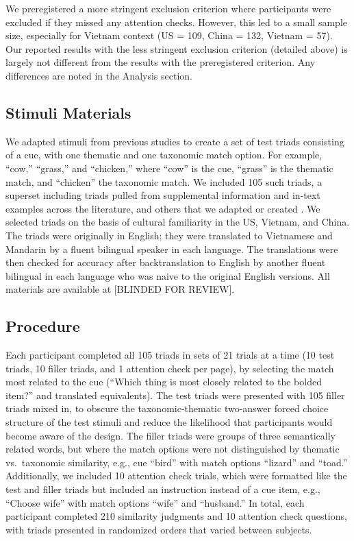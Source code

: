 \documentclass[10pt, letterpaper]{article}
\begin{document}
We preregistered a more stringent exclusion criterion where participants
were excluded if they missed any attention checks. However, this led to
a small sample size, especially for Vietnam context (US = 109, China =
132, Vietnam = 57). Our reported results with the less stringent
exclusion criterion (detailed above) is largely not different from the
results with the preregistered criterion. Any differences are noted in
the Analysis section.

\hypertarget{stimuli-materials}{%
\subsection{Stimuli Materials}\label{stimuli-materials}}

We adapted stimuli from previous studies to create a set of test triads
consisting of a cue, with one thematic and one taxonomic match option.
For example, ``cow,'' ``grass,'' and ``chicken,'' where ``cow'' is the
cue, ``grass'' is the thematic match, and ``chicken'' the taxonomic
match. We included 105 such triads, a superset including triads pulled
from supplemental information and in-text examples across the
literature, and others that we adapted or created . We selected triads
on the basis of cultural familiarity in the US, Vietnam, and China. The
triads were originally in English; they were translated to Vietnamese
and Mandarin by a fluent bilingual speaker in each language. The
translations were then checked for accuracy after backtranslation to
English by another fluent bilingual in each language who was naive to
the original English versions. All materials are available at {[}BLINDED
FOR REVIEW{]}.

\hypertarget{procedure}{%
\subsection{Procedure}\label{procedure}}

Each participant completed all 105 triads in sets of 21 trials at a time
(10 test triads, 10 filler triads, and 1 attention check per page), by
selecting the match most related to the cue (``Which thing is most
closely related to the bolded item?'' and translated equivalents). The
test triads were presented with 105 filler triads mixed in, to obscure
the taxonomic-thematic two-answer forced choice structure of the test
stimuli and reduce the likelihood that participants would become aware
of the design. The filler triads were groups of three semantically
related words, but where the match options were not distinguished by
thematic vs.~taxonomic similarity, e.g., cue ``bird'' with match options
``lizard'' and ``toad.'' Additionally, we included 10 attention check
trials, which were formatted like the test and filler triads but
included an instruction instead of a cue item, e.g., ``Choose wife''
with match options ``wife'' and ``husband.'' In total, each participant
completed 210 similarity judgments and 10 attention check questions,
with triads presented in randomized orders that varied between subjects.
\end{document}
